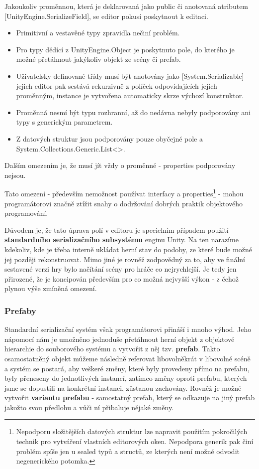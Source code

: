 Jakoukoliv proměnnou, která je deklarovaná jako public či anotovaná atributem [UnityEngine.SerializeField], se editor pokusí poskytnout k editaci.
\begin{itemize}
    \item Primitivní a vestavěné typy zpravidla nečiní problém.
    \item Pro typy dědící z UnityEngine.Object je poskytnuto pole, do kterého je možné přetáhnout jakýkoliv objekt ze scény či prefab.
    \item Uživatelsky definované třídy musí být anotovány jako [System.Serializable] - jejich editor pak sestává rekurzivně z políček odpovídajících jejich proměnným, instance je vytvořena automaticky skrze výchozí konstruktor.
    \item Proměnná nesmí být typu rozhranní, až do nedávna nebyly podporovány ani typy s generickým parametrem.
    \item Z datových struktur jsou podporovány pouze obyčejné pole a System.Collections.Generic.List<>.
\end{itemize}
Dalším omezením je, že musí jít vždy o proměnné - properties podporovány nejsou.

Tato omezení - především nemožnost používat interfacy a properties\footnote{Nepodporu složitějších datových struktur lze napravit použitím pokročilých technik pro vytváření vlastních editorových oken. Nepodpora generik pak činí problém spíše jen u sealed typů a structů, ze kterých není možné odvodit negenerického potomka.} - mohou programátorovi značně ztížit snahy o dodržování dobrých praktik objektového programování.

Důvodem je, že tato úprava polí v editoru je specielním případem použití \textbf{standardního serializačního subsystému} enginu Unity. Na ten narazíme kdekoliv, kde je třeba interně ukládat herní stav do podoby, ze které bude možné jej později rekonstruovat. Mimo jiné je rovněž zodpovědný za to, aby ve finální sestavené verzi hry bylo načítání scény pro hráče co nejrychlejší. Je tedy jen přirozené, že je koncipován především pro co možná nejvyšší výkon - z čehož plynou výše zmíněná omezení.

\subsubsection*{Prefaby}
Standardní serializační systém však programátorovi přináší i mnoho výhod. Jeho nápomocí nám je umožněno jednoduše přetáhnout herní objekt z objektové hierarchie do souborového systému a vytvořit z něj tzv. \textbf{prefab}. Takto osamostatněný objekt můžeme následně referovat libovolněkrát v libovolné scéně a systém se postará, aby veškeré změny, které byly provedeny přímo na prefabu, byly přeneseny do jednotlivých instancí, zatímco změny oproti prefabu, kterých jsme se dopustili na konkrétní instanci, zůstanou zachovány. Rovněž je možné vytvořit \textbf{variantu prefabu} - samostatný prefab, který se odkazuje na jiný prefab jakožto svou předlohu a vůči ní přibaluje nějaké změny. 

